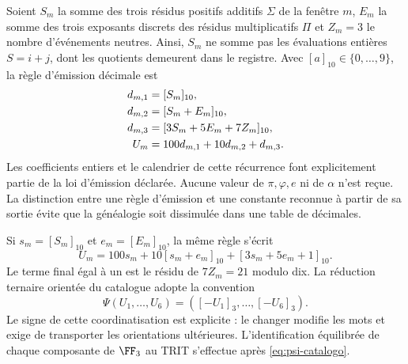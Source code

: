 Soient \(S_m\) la somme des trois résidus positifs additifs \(\Sigma\) de la fenêtre \(m\), \(E_m\) la somme des trois exposants discrets des résidus multiplicatifs \(\Pi\) et \(Z_m=3\) le nombre d’événements neutres. Ainsi, \(S_m\) ne somme pas les évaluations entières \(S=i+j\), dont les quotients demeurent dans le registre. Avec \([a]_{10}\in\{0,\ldots,9\}\), la règle d’émission décimale est
\begin{align}
 d_{m,1}&=[S_m]_{10},\notag\\
 d_{m,2}&=[S_m+E_m]_{10},\notag\\
 d_{m,3}&=[3S_m+5E_m+7Z_m]_{10},\notag\\
 U_m&=100d_{m,1}+10d_{m,2}+d_{m,3}.
 \label{eq:emisor-seis}
\end{align}
Les coefficients entiers et le calendrier de cette récurrence font explicitement partie de la loi d’émission déclarée. Aucune valeur de \(\pi,\varphi,e\) ni de \(\alpha\) n’est reçue. La distinction entre une règle d’émission et une constante reconnue à partir de sa sortie évite que la généalogie soit dissimulée dans une table de décimales.

Si \(s_m=[S_m]_{10}\) et \(e_m=[E_m]_{10}\), la même règle s’écrit
\begin{equation}
 U_m=100s_m+10[s_m+e_m]_{10}+[3s_m+5e_m+1]_{10}.
 \label{eq:acoplamiento}
\end{equation}
Le terme final égal à un est le résidu de \(7Z_m=21\) modulo dix. La réduction ternaire orientée du catalogue adopte la convention
\begin{equation}
 \Psi(U_1,\ldots,U_6)=([-U_1]_3,\ldots,[-U_6]_3).
 \label{eq:psi-catalogo}
\end{equation}
Le signe de cette coordinatisation est explicite : le changer modifie les mots et exige de transporter les orientations ultérieures. L'identification équilibrée de chaque composante de \(\FF_3\) au TRIT s'effectue après \eqref{eq:psi-catalogo}.

